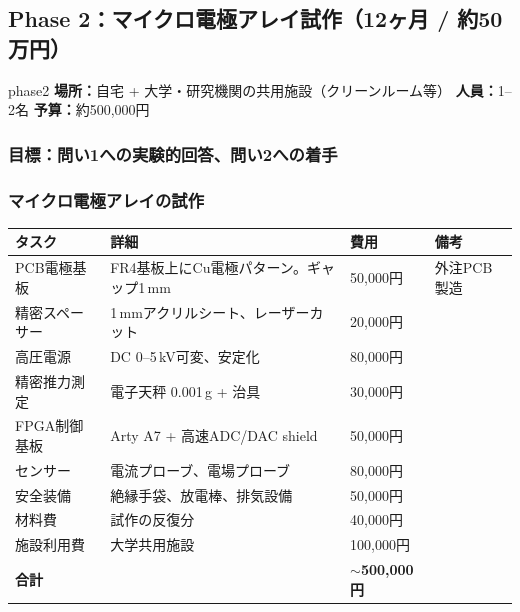 \documentclass[12pt,a4paper]{ltjsarticle}
\begin{document}
\newpage
\subsection{Phase 2：マイクロ電極アレイ試作（12ヶ月 / 約50万円）}

\begin{phasebox}{phase2}
\textbf{場所：}自宅 + 大学・研究機関の共用施設（クリーンルーム等） \quad
\textbf{人員：}1--2名 \quad
\textbf{予算：}約500,000円
\end{phasebox}

\subsubsection{目標：問い1への実験的回答、問い2への着手}

\subsubsection{マイクロ電極アレイの試作}

\begin{center}
\sffamily\small
\begin{tabular}{@{}p{3cm}p{4cm}p{2cm}p{3cm}@{}}
\toprule
\textbf{タスク} & \textbf{詳細} & \textbf{費用} & \textbf{備考} \\
\midrule
PCB電極基板 & FR4基板上にCu電極パターン。ギャップ1\,mm & 50,000円 & 外注PCB製造 \\
精密スペーサー & 1\,mmアクリルシート、レーザーカット & 20,000円 & \\
高圧電源 & DC 0--5\,kV可変、安定化 & 80,000円 & \\
精密推力測定 & 電子天秤 0.001\,g + 治具 & 30,000円 & \\
FPGA制御基板 & Arty A7 + 高速ADC/DAC shield & 50,000円 & \\
センサー & 電流プローブ、電場プローブ & 80,000円 & \\
安全装備 & 絶縁手袋、放電棒、排気設備 & 50,000円 & \\
材料費 & 試作の反復分 & 40,000円 & \\
施設利用費 & 大学共用施設 & 100,000円 & \\
\midrule
\textbf{合計} & & \textbf{$\sim$500,000円} & \\
\bottomrule
\end{tabular}
\end{center}
\end{document}
